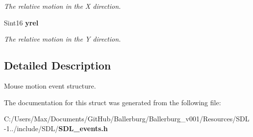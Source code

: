 \begin{DoxyCompactItemize}
\begin{DoxyCompactList}\small\item\em The relative motion in the X direction. \end{DoxyCompactList}\item 
Sint16 {\bf yrel}\label{struct_s_d_l___mouse_motion_event_a371e2cd4087a507663e512436fb4009b}

\begin{DoxyCompactList}\small\item\em The relative motion in the Y direction. \end{DoxyCompactList}\end{DoxyCompactItemize}


\subsection{Detailed Description}
Mouse motion event structure. 

The documentation for this struct was generated from the following file\+:\begin{DoxyCompactItemize}
\item 
C\+:/\+Users/\+Max/\+Documents/\+Git\+Hub/\+Ballerburg/\+Ballerburg\+\_\+v001/\+Resources/\+S\+D\+L-\/1../include/\+S\+D\+L/{\bf S\+D\+L\+\_\+events.\+h}\end{DoxyCompactItemize}
